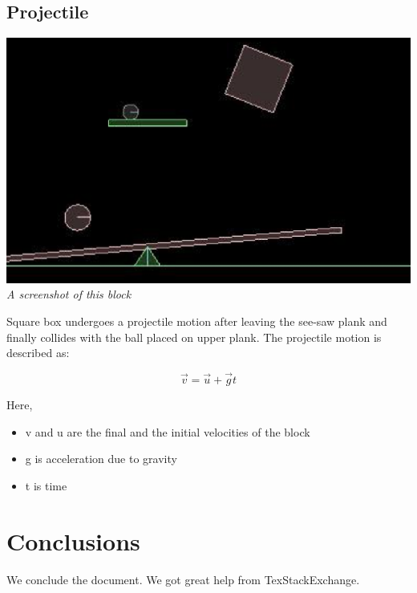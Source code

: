 \documentclass[11pt]{article}
\begin{document}
\subsection{Projectile}

\begin{center}
  \includegraphics[scale = 0.5]{ob3} \\
  \emph{A screenshot of this block} \\
\end{center}

Square box undergoes a projectile motion after leaving the see-saw plank and finally collides with the ball placed on upper plank.
The projectile motion is described as:

\begin{equation}
	\vec{v} = \vec{u} + \vec{g}t
\end{equation}

Here, 	
\begin{itemize}
\item v and u are the final and the initial velocities of the block
\item g is acceleration due to gravity
\item t is time
\end{itemize}


\section{Conclusions}
	We conclude the document. We got great help from TexStackExchange\cite{tex}.



\end{document}
